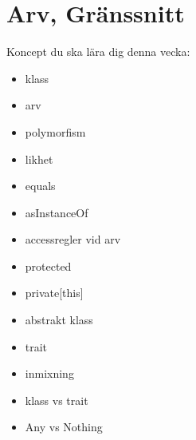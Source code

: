 \chapter{Arv, Gränssnitt}\label{chapter:W07}
Koncept du ska lära dig denna vecka:
\begin{multicols}{2}\begin{itemize}[nosep,label={$\square$},leftmargin=*]
\item klass
\item arv
\item polymorfism
\item likhet
\item equals
\item asInstanceOf
\item accessregler vid arv
\item protected
\item private[this]
\item abstrakt klass
\item trait
\item inmixning
\item klass vs trait
\item Any vs Nothing\end{itemize}\end{multicols}
